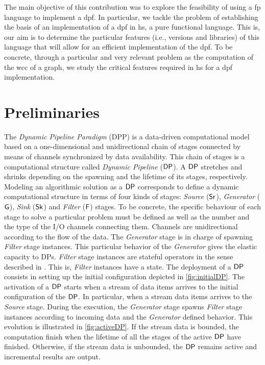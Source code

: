The main objective of this contribution was to explore the feasibility of using a  \acrfull{fp} language to implement a \acrshort{dpf}. In particular, 
we tackle the problem of establishing the basis of an implementation of a \acrshort{dpf}  in \acrshort{hs}, a pure functional language. This is,  our aim is to determine the particular features (i.e., versions and libraries) 
of this language that will allow for an efficient implementation of the \acrshort{dpf}. To be concrete, through a particular and very relevant problem as the computation of the \acrfull{wcc} of a graph,  we study the 
critical features required  in \acrshort{hs} for a \acrshort{dpf} implementation.

\section{Preliminaries}
The \textit{Dynamic Pipeline Paradigm} (DPP) \cite{dpdef} is a data-driven computational model  based on a one-dimensional and unidirectional chain of stages connected by means of channels synchronized by data availability. 
This chain of stages is a computational structure called \textit{Dynamic Pipeline} ($\mathsf{DP}$). A $\mathsf{DP}$ stretches and shrinks depending on the spawning and the lifetime of its stages, respectively. Modeling an algorithmic 
solution as a $\mathsf{DP}$ corresponds to define a dynamic computational structure  in terms of four kinds of stages:  \textit{Source} ($\mathsf{Sr}$),  \textit{Generator} ($\mathsf{G}$),  \textit{Sink} ($\mathsf{Sk}$) and \textit{Filter} ($\mathsf{F}$) stages. 
To be concrete, the specific  behaviour of each stage to solve a particular problem must be defined as well as the number and the type of the I/O channels connecting them. Channels are unidirectional according to the flow of the data. 
The \textit{Generator} stage is in charge of spawning \textit{Filter} stage instances. This particular behavior of the \textit{Generator}  gives the elastic capacity to DPs. \textit{Filter} stage instances are stateful operators in the 
sense described in \cite{HR19}. This is, \textit{Filter} instances have a state.  
The deployment of a $\mathsf{DP}$ consists in setting up the initial configuration depicted in \autoref{fig:initialDP}. The activation of a $\mathsf{DP}$ starts when a stream of data items arrives to the initial configuration of the $\mathsf{DP}$. 
In particular, when a stream data items arrives to the \textit{Source} stage. During the execution, the  \textit{Generator} stage spawns \textit{Filter} stage instances according to incoming data and the \textit{Generator} defined behavior. 
This evolution is illustrated in  \autoref{fig:activeDP}. If the stream  data is bounded, the computation finish when the lifetime of all the stages of the active $\mathsf{DP}$ have finished. Otherwise, if the stream data is unbounded, 
the $\mathsf{DP}$ remains active and incremental results are output. 

